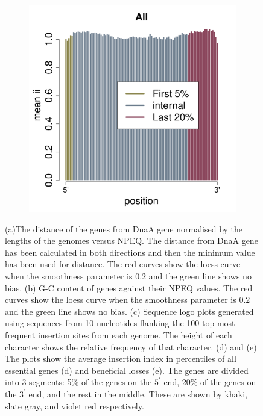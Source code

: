 \documentclass[12pt,letterpaper]{article}
\begin{document}
\begin{figure}
\begin{subfigure}{.49\textwidth}
  \includegraphics[scale=0.25, page=4]{insertion-position-bias.pdf}
  \caption{}
  \label{fig:insertion-position-bias-ben}
\end{subfigure}
\caption{(a)The distance of the genes from DnaA gene normalised by the lengths of the genomes versus NPEQ. The distance from DnaA gene has been calculated in both directions and then the minimum value has been used for distance. The red curves show the loess curve when the smoothness parameter is $0.2$ and the green line shows no bias. (b) G-C content of genes against their NPEQ values. The red curves show the loess curve when the smoothness parameter is $0.2$ and the green line shows no bias. (c) Sequence logo plots generated using sequences from 10 nucleotides flanking the 100 top most frequent insertion sites from each genome. The height of each character shows the relative frequency of that character. (d) and (e) The plots show the average insertion index in percentiles of all essential genes (d) and beneficial losses (e). The genes are divided into 3 segments: 5\% of the genes on the $5^\prime$ end, 20\% of the genes on the $3^\prime$ end, and the rest in the middle. These are shown by khaki, slate gray, and violet red respectively.}
\label{fig:biases}
\end{figure}
\end{document}
